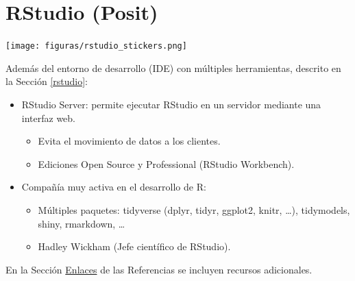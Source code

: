 \documentclass[
]{book}
\theoremstyle{break}
\theoremstyle{nonumberplain}
\begin{document}
\hypertarget{rstudio-com}{%
\section{RStudio (Posit)}\label{rstudio-com}}

\texttt{[image: figuras/rstudio\_stickers.png]}

Además del entorno de desarrollo (IDE) con múltiples herramientas,
descrito en la Sección \ref{rstudio}:

\begin{itemize}
\item
  RStudio Server: permite ejecutar RStudio en un servidor mediante una interfaz web.

  \begin{itemize}
  \item
    Evita el movimiento de datos a los clientes.
  \item
    Ediciones Open Source y Professional (RStudio Workbench).
  \end{itemize}
\end{itemize}

\begin{itemize}
\item
  Compañía muy activa en el desarrollo de R:

  \begin{itemize}
  \item
    Múltiples paquetes: tidyverse (dplyr, tidyr, ggplot2, knitr, \ldots), tidymodels, shiny, rmarkdown, \ldots{}
  \item
    Hadley Wickham (Jefe científico de RStudio).
  \end{itemize}
\end{itemize}

En la Sección \protect\hyperlink{links}{Enlaces} de las Referencias se incluyen recursos adicionales.

  
\end{document}
